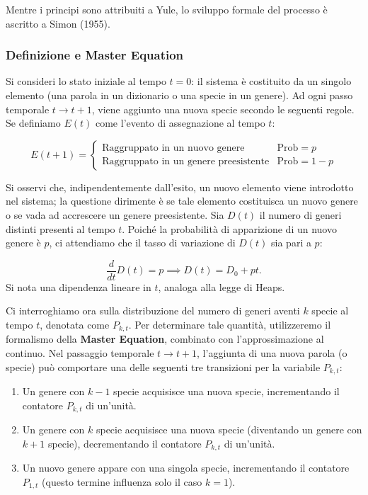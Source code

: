 \noindent Mentre i principi sono attribuiti a Yule, lo sviluppo formale del processo è ascritto a Simon (1955). 

\subsubsection{Definizione e Master Equation}

Si consideri lo stato iniziale al tempo $t = 0$: il sistema è costituito da un singolo elemento (una parola in un dizionario o una specie in un genere). Ad ogni passo temporale $t \to t + 1$, viene aggiunto una nuova specie secondo le seguenti regole. Se definiamo $E(t)$ come l'evento di assegnazione al tempo $t$:

\begin{equation}
    E(t+1) = 
    \begin{cases} 
    \text{Raggruppato in un nuovo genere} & \text{Prob} = p \\
    \text{Raggruppato in un genere preesistente} & \text{Prob} = 1-p 
    \end{cases}
    \label{eq:assignment_prob}
\end{equation}

Si osservi che, indipendentemente dall'esito, un nuovo elemento viene introdotto nel sistema; la questione dirimente è se tale elemento costituisca un nuovo genere o se vada ad accrescere un genere preesistente.
Sia $D(t)$ il numero di generi distinti presenti al tempo $t$. Poiché la probabilità di apparizione di un nuovo genere è $p$, ci attendiamo che il tasso di variazione di $D(t)$ sia pari a $p$:

\begin{equation}
    \frac{d}{dt}D(t) = p \implies D(t) = D_{0} + p t.
\end{equation}
Si nota una dipendenza lineare in $t$, analoga alla legge di Heaps.


\noindent Ci interroghiamo ora sulla distribuzione del numero di generi aventi $k$ specie al tempo $t$, denotata come $P_{k,t}$. Per determinare tale quantità, utilizzeremo il formalismo della \textbf{Master Equation}, combinato con l'approssimazione al continuo. Nel passaggio temporale $t \to t+1$, l'aggiunta di una nuova parola (o specie) può comportare una delle seguenti tre transizioni per la variabile $P_{k,t}$:

\begin{enumerate}
    \item Un genere con $k-1$ specie acquisisce una nuova specie, incrementando il contatore $P_{k,t}$ di un'unità.
    \item Un genere con $k$ specie acquisisce una nuova specie (diventando un genere con $k+1$ specie), decrementando il contatore $P_{k,t}$ di un'unità.
    \item Un nuovo genere appare con una singola specie, incrementando il contatore $P_{1,t}$ (questo termine influenza solo il caso $k=1$).
\end{enumerate}


